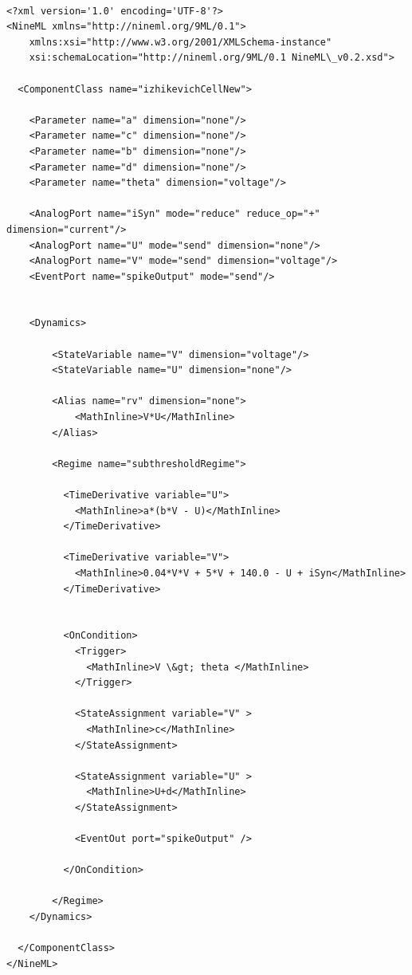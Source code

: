 \documentclass{article}
\begin{document}
\begin{lstlisting}

<?xml version='1.0' encoding='UTF-8'?>
<NineML xmlns="http://nineml.org/9ML/0.1">
    xmlns:xsi="http://www.w3.org/2001/XMLSchema-instance"
    xsi:schemaLocation="http://nineml.org/9ML/0.1 NineML\_v0.2.xsd">

  <ComponentClass name="izhikevichCellNew">

    <Parameter name="a" dimension="none"/>
    <Parameter name="c" dimension="none"/>
    <Parameter name="b" dimension="none"/>
    <Parameter name="d" dimension="none"/>
    <Parameter name="theta" dimension="voltage"/>

    <AnalogPort name="iSyn" mode="reduce" reduce_op="+" dimension="current"/>
    <AnalogPort name="U" mode="send" dimension="none"/>
    <AnalogPort name="V" mode="send" dimension="voltage"/>
    <EventPort name="spikeOutput" mode="send"/>


    <Dynamics>

        <StateVariable name="V" dimension="voltage"/>
        <StateVariable name="U" dimension="none"/>

        <Alias name="rv" dimension="none">
            <MathInline>V*U</MathInline>
        </Alias>

        <Regime name="subthresholdRegime">

          <TimeDerivative variable="U">
            <MathInline>a*(b*V - U)</MathInline>
          </TimeDerivative>

          <TimeDerivative variable="V">
            <MathInline>0.04*V*V + 5*V + 140.0 - U + iSyn</MathInline>
          </TimeDerivative>


          <OnCondition>
            <Trigger>
              <MathInline>V \&gt; theta </MathInline>
            </Trigger>

            <StateAssignment variable="V" >
              <MathInline>c</MathInline>
            </StateAssignment>

            <StateAssignment variable="U" >
              <MathInline>U+d</MathInline>
            </StateAssignment>

            <EventOut port="spikeOutput" />

          </OnCondition>

        </Regime>
    </Dynamics>

  </ComponentClass>
</NineML>
\end{lstlisting}

\newpage
\appendix
\end{document}
